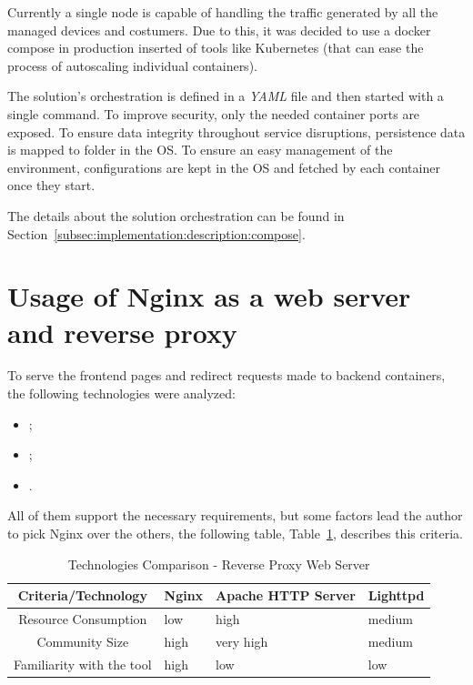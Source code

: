 Currently a single node is capable of handling the traffic generated by all the managed devices and costumers. Due to this, it was decided to use a docker compose in production inserted of tools like Kubernetes (that can ease the process of autoscaling individual containers).

The solution's orchestration is defined in a \textit{YAML} file and then started with a single command. To improve security, only the needed container ports are exposed. To ensure data integrity throughout service disruptions, persistence data is mapped to folder in the \gls{OS}. To ensure an easy management of the environment, configurations are kept in the \gls{OS} and fetched by each container once they start.

The details about the solution orchestration can be found in Section~\ref{subsec:implementation:description:compose}.

\section{Usage of Nginx as a web server and reverse proxy}
\label{subsec:implementation:decisions:nginx}

To serve the frontend pages and redirect requests made to backend containers, the following technologies were analyzed:

\begin{itemize}
    \item {};
    \item {};
    \item {}.
\end{itemize}

All of them support the necessary requirements, but some factors lead the author to pick Nginx over the others, the following table, Table~\ref{tab:implementation:decisions:nginx:compare}, describes this criteria.

\begin{table}[H]
    \caption{Technologies Comparison - Reverse Proxy Web Server}
    \label{tab:implementation:decisions:nginx:compare}
    \centering
    \begin{tabular}{@{}clll@{}}
    \toprule
    \textbf{Criteria/Technology} & \textbf{Nginx} & \textbf{Apache HTTP Server} & \textbf{Lighttpd} \\ \midrule
    Resource Consumption      & low  & high      & medium \\ \midrule
    Community Size            & high & very high & medium \\ \midrule
    Familiarity with the tool & high & low       & low    \\ \bottomrule
    \end{tabular}
\end{table}

